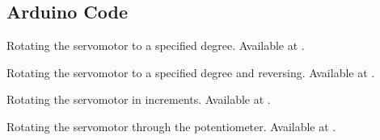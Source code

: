 \subsection{Arduino Code}
\lstset{style=mystyle}
\label{sec:servo-arduino-code}

\begin{ardcode}
   {Rotating
    the servomotor to a specified degree.  Available at
    .}
  \label{ard:servo-init}
  
\end{ardcode}

\begin{ardcode}
   {Rotating
    the servomotor to a specified degree and reversing.  Available at
    .}
  \label{ard:servo-reverse}
  
\end{ardcode}

\begin{ardcode}
   {Rotating the
    servomotor in increments.  Available at
    .}
  \label{ard:servo-loop}
  
\end{ardcode}

\begin{ardcode}
  {Rotating the servomotor through the potentiometer.  Available at
    .}
  \label{ard:servo-pot}
  
\end{ardcode}

